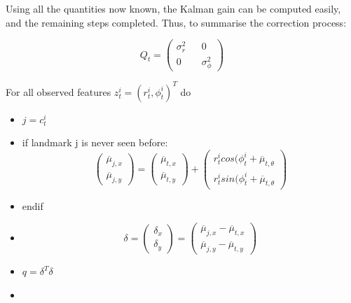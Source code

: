 \documentclass[a4paper]{article}
\begin{document}
Using all the quantities now known, the Kalman gain can be computed easily, and the remaining steps completed. Thus, to summarise the correction process:

\begin{equation*}
    Q_t = 
    \begin{pmatrix}
            \sigma_r^2 && 0 \\ 0 && \sigma_{\phi}^2
    \end{pmatrix}
\end{equation*}

For all observed features $z_t^i = (r_t^i, \phi_t^i)^T$ do
\begin{itemize}
    \item $j = c_t^i$
    \item if landmark j is never seen before:
    \begin{equation*}
    \begin{pmatrix}
        \overline{\mu}_{j,x} \\ \overline{\mu}_{j,y}
    \end{pmatrix}
    =
    \begin{pmatrix}
            \overline{\mu}_{t,x} \\ \overline{\mu}_{t,y}
    \end{pmatrix} 
    + 
    \begin{pmatrix}
            r_t^i cos(\phi_t^i + \overline{\mu}_{t,\theta}
            \\
            r_t^i sin(\phi_t^i + \overline{\mu}_{t,\theta}
    \end{pmatrix}
    \end{equation*}
    \item endif
    \item \begin{equation*}
            \delta = 
        \begin{pmatrix}
                \delta_x \\ \delta_y
        \end{pmatrix} 
        = 
        \begin{pmatrix}
            \overline{\mu}_{j,x} - \overline{\mu}_{t,x}
            \\
            \overline{\mu}_{j,y} - \overline{\mu}_{t,y}
        \end{pmatrix}
        \end{equation*}
        \item $q = \delta^T \delta$
        \item \begin{equation*}

\end{equation*}
\end{itemize}
\end{document}
